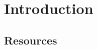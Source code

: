\def\filepath{C:/Users/Owner/Dropbox/Math/templates}








\def\name{Elliptic Curves}




\maketitle

%
\tableofcontents
\frontmatter

\mainmatter 
\chapter*{Introduction}

\section*{Resources}

